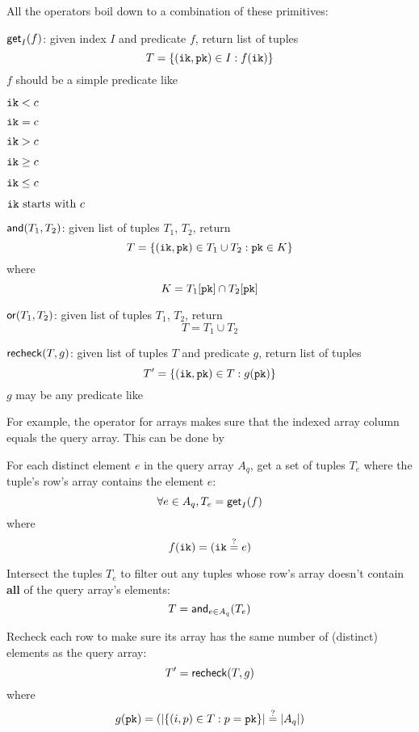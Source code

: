 \documentclass[11pt]{article}
\begin{document}
All the operators boil down to a combination of these primitives:

\begin{oparts}
\item
  $\mathsf{get}_I(f)$:
  given index $I$ and predicate $f$, return list of tuples
  \[
    T = \lbrace(\mathtt{ik}, \mathtt{pk}) \in I : f(\mathtt{ik})\rbrace
  \]
  $f$ should be a simple predicate like
  \begin{oparts}
  \item
    $\mathtt{ik} < c$
  \item
    $\mathtt{ik} = c$
  \item
    $\mathtt{ik} > c$
  \item
    $\mathtt{ik} \geq c$
  \item
    $\mathtt{ik} \leq c$
  \item
    $\mathtt{ik}~\textnormal{starts with}~c$
  \end{oparts}
\item
  $\mathsf{and}(T_1, T_2)$:
  given list of tuples $T_1$, $T_2$, return
  \[
    T = \lbrace(\mathtt{ik}, \mathtt{pk}) \in T_1 \cup T_2 : \mathtt{pk} \in K\rbrace
  \]
  where
  \[
    K = T_1[\mathtt{pk}] \cap T_2[\mathtt{pk}]
  \]
\item
  $\mathsf{or}(T_1, T_2)$:
  given list of tuples $T_1$, $T_2$, return
  \[
    T = T_1 \cup T_2
  \]
\item
  $\mathsf{recheck}(T, g)$:
  given list of tuples $T$ and predicate $g$, return list of tuples
  \[
    T' = \lbrace(\mathtt{ik}, \mathtt{pk}) \in T : g(\mathtt{pk})\rbrace
  \]
  $g$ may be any predicate like
  \begin{oparts}
  \item
  \item
  \end{oparts}
\end{oparts}

For example, the \sqlinline{=} operator for arrays makes sure that the indexed
array column equals the query array. This can be done by

\begin{nparts}
\item
  For each distinct element $e$ in the query array $A_q$, get a set of tuples
  $T_e$ where the tuple's row's array contains the element $e$:
  \[
    \forall e \in A_q, T_e = \mathsf{get}_I(f)
  \]
  where
  \[
    f(\mathtt{ik}) = \lparen\mathtt{ik} \overset{?}{=} e\rparen
  \]
\item
  Intersect the tuples $T_e$ to filter out any tuples whose row's array doesn't
  contain \textbf{all} of the query array's elements:
  \[
    T = \mathsf{and}_{e \in A_q}(T_e)
  \]
\item
  Recheck each row to make sure its array has the same number of (distinct)
  elements as the query array:
  \[
    T' = \mathsf{recheck}(T, g)
  \]
  where
  \[
    g(\mathtt{pk}) = \lparen\lvert\lbrace(i, p) \in T : p = \mathtt{pk}\rbrace\rvert \overset{?}{=}
    \lvert A_q\rvert\rparen
  \]
\end{nparts}
\end{document}
